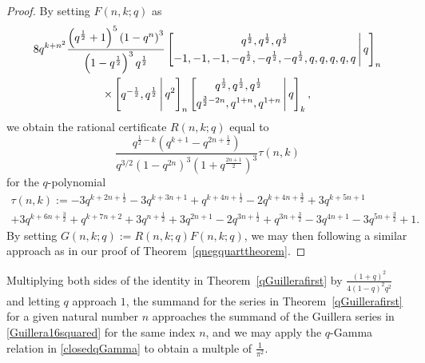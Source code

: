 \documentclass[12pt]{article}
\begin{document}
\begin{proof}
 By setting $ F(n, k; q)$ as 
\begin{multline*}
 8 q^{k+n^2} 
 \frac{\left(q^{\frac{1}{2}}+1\right)^5 \left(1-q^n\right)^3}{\left(1-q^{\frac{1}{2}}\right)^3 q^{\frac{1}{2}}} 
 \left[ \begin{matrix} q^{\frac{1}{2}}, q^{\frac{1}{2}}, q^{\frac{1}{2}} \vspace{1mm} \\ 
 -1, -1, -1, -q^{\frac{1}{2}}, -q^{\frac{1}{2}}, -q^{\frac{1}{2}}, q, q, q, q, q 
 \end{matrix} \, \Bigg| \, q \right]_{n} \\ 
 \times \left[ \begin{matrix} q^{-\frac{1}{2}}, q^{\frac{1}{2}} 
 \end{matrix} \, \Bigg| \, q^2 \right]_{n} 
 \left[ \begin{matrix} q^{\frac{1}{2}}, q^{\frac{1}{2}}, q^{\frac{1}{2}} \vspace{1mm} \\ 
 q^{\frac{3}{2} - 2 n}, q^{1+n}, q^{1+n} \end{matrix} \, \Bigg| \, q \right]_{k}, 
\end{multline*}
 we obtain the rational certificate $R(n, k; q)$ equal to 
 $$ \frac{q^{\frac{1}{2}-k} \left(q^{k+1}-q^{2 n+\frac{1}{2}}\right)}{ q^{3/2} \left(1-q^{2 
 n}\right)^3 \left(1+q^{\frac{2 n + 1}{2} }\right)^3 } \tau(n, k) $$
 for the $q$-polynomial
\begin{multline*}
 \tau(n, k) := 
 -3 q^{k+2 n+\frac{1}{2}}-3 q^{k+3 n+1}+q^{k+4 n+\frac{1}{2}}-2 q^{k+4 n+\frac{3}{2}} + 
 3 q^{k+5 n+1} \\ 
 + 3 q^{k+6 n+\frac{3}{2}}+q^{k+7 n+2}+3 
 q^{n+\frac{1}{2}}+3 q^{2 n+1}-2 q^{3 n+\frac{1}{2}}+q^{3 n+\frac{3}{2}}-3 q^{4 n+1}-3 q^{5 n+\frac{3}{2}}+1. 
\end{multline*}
 By setting $G(n, k; q) := R(n, k; q) F(n, k; q)$, we may then following a similar approach as in our proof of 
 Theorem~\ref{qnegquarttheorem}. 
\end{proof}

 Multiplying both sides of the identity in Theorem~\ref{qGuillerafirst} by $\frac{(1+q)^2}{4 (1-q)^2 q^2}$ and letting $q$ 
 approach $1$, the summand for the series in Theorem~\ref{qGuillerafirst} for a given natural number $n$
 approaches the summand of the Guillera series in \eqref{Guillera16squared}
 for the same index $n$, 
 and we may apply the $q$-Gamma relation in \eqref{closedqGamma}
 to obtain a multple of $\frac{1}{\pi^2}$. 
\end{document}
